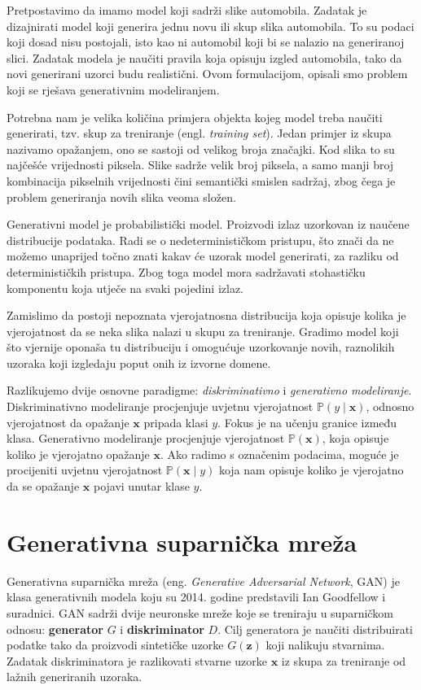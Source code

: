 \documentclass[times, utf8, seminar, numeric]{fer}
\begin{document}
		Pretpostavimo da imamo model koji sadrži slike automobila. Zadatak je dizajnirati model koji generira jednu novu ili skup slika automobila. To su podaci koji dosad nisu postojali, isto kao ni automobil koji bi se nalazio na generiranoj slici. Zadatak modela je naučiti pravila koja opisuju izgled automobila, tako da novi generirani uzorci budu realistični. Ovom formulacijom, opisali smo problem koji se rješava generativnim modeliranjem. 
		
		Potrebna nam je velika količina primjera objekta kojeg model treba naučiti generirati, tzv. skup za treniranje (engl. \textit{training set}). Jedan primjer iz skupa nazivamo opažanjem, ono se sastoji od velikog broja značajki. Kod slika to su najčešće vrijednosti piksela. Slike sadrže velik broj piksela, a samo manji broj kombinacija pikselnih vrijednosti čini semantički smislen sadržaj, zbog čega je problem generiranja novih slika veoma složen.
		
		Generativni model je probabilistički model. Proizvodi izlaz uzorkovan iz naučene distribucije podataka. Radi se o nedeterminističkom pristupu, što znači da ne možemo unaprijed točno znati kakav će uzorak model generirati, za razliku od determinističkih pristupa. Zbog toga model mora sadržavati stohastičku komponentu koja utječe na svaki pojedini izlaz.
		
		Zamislimo da postoji nepoznata vjerojatnosna distribucija koja opisuje kolika je vjerojatnost da se neka slika nalazi u skupu za treniranje. Gradimo model koji što vjernije oponaša tu distribuciju i omogućuje uzorkovanje novih, raznolikih uzoraka koji izgledaju poput onih iz izvorne domene.
		
		Razlikujemo dvije osnovne paradigme: \textit{diskriminativno} i \textit{generativno modeliranje}. Diskriminativno modeliranje procjenjuje uvjetnu vjerojatnost $\mathbb{P}(y \mid \mathbf{x})$, odnosno vjerojatnost da opažanje $\mathbf{x}$ pripada klasi $y$. Fokus je na učenju granice između klasa. Generativno modeliranje procjenjuje vjerojatnost $\mathbb{P}(\mathbf{x})$, koja opisuje koliko je vjerojatno opažanje $\mathbf{x}$. Ako radimo s označenim podacima, moguće je procijeniti uvjetnu vjerojatnost $\mathbb{P}(\mathbf{x} \mid y)$ koja nam opisuje koliko je vjerojatno da se opažanje $\mathbf{x}$ pojavi unutar klase $y$.
		
		
		\section{Generativna suparnička mreža}
		Generativna suparnička mreža (eng. \textit{Generative Adversarial Network}, GAN) je klasa generativnih modela koju su 2014. godine predstavili Ian Goodfellow i suradnici. GAN sadrži dvije neuronske mreže koje se treniraju u suparničkom odnosu: \textbf{generator} $G$ i \textbf{diskriminator} $D$. Cilj generatora je naučiti distribuirati podatke tako da proizvodi sintetičke uzorke $G(\bm{z})$ koji nalikuju stvarnima. Zadatak diskriminatora je razlikovati stvarne uzorke $\bm{x}$ iz skupa za treniranje od lažnih generiranih uzoraka.
		
\end{document}
